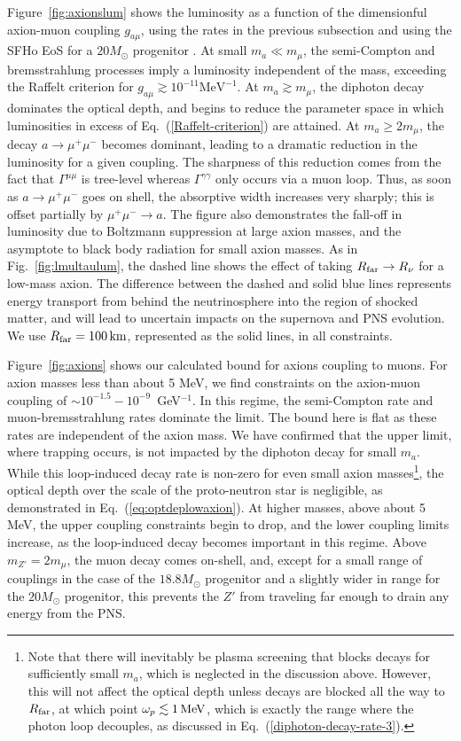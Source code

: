 \documentclass[11pt]{article}
\newcommand{\Eq}[1]{Eq.~(\ref{#1})} \newcommand{\Eqs}[2]{Eqs.~(\ref{#1}) and (\ref{#2})} \newcommand{\Eqm}[2]{Eqs.~(\ref{#1}) through (\ref{#2})}
\newcommand{\Fig}[1]{Fig.~\ref{#1}} \newcommand{\Figs}[2]{Figs.~\ref{#1} and \ref{#2}}
\begin{document}
Figure~\ref{fig:axionslum} shows the luminosity as a function of the dimensionful axion-muon coupling $g_{a \mu}$, using the rates in the previous subsection and using the SFHo EoS for a $20 M_\odot$ progenitor \cite{Bollig:2020xdr}. At small $m_a \ll m_\mu$, the semi-Compton and bremsstrahlung processes imply a luminosity independent of the mass, exceeding the Raffelt criterion for $g_{a\mu}\gtrsim  10^{-11} \text{MeV}^{-1}$. At $m_a \gtrsim m_\mu$, the diphoton decay dominates the optical depth, and begins to reduce the parameter space in which luminosities in excess of Eq.~(\ref{Raffelt-criterion}) are attained. At $m_a \geq 2m_\mu$, the decay $a \to \mu^+ \mu^-$ becomes dominant, leading to a dramatic reduction in the luminosity for a given coupling. The sharpness of this reduction comes from the fact that $\Gamma^{\mu \mu}$ is tree-level whereas $\Gamma^{\gamma \gamma}$ only occurs via a muon loop. Thus, as soon as $a \to \mu^+ \mu^-$ goes on shell, the absorptive width increases very sharply; this is offset partially by $\mu^+ \mu^- \to a$. The figure also demonstrates the fall-off in luminosity due to Boltzmann suppression at large axion masses, and the asymptote to black body radiation for small axion masses. As in \Fig{fig:lmultaulum}, the dashed line shows the effect of taking $R_{\rm far} \to R_\nu$ for a low-mass axion. The difference between the dashed and solid blue lines represents energy transport from behind the neutrinosphere into the region of shocked matter, and will lead to uncertain impacts on the supernova and PNS evolution. We use $R_{\rm far}=100\operatorname{km}$, represented as the solid lines, in all constraints.

Figure~\ref{fig:axions} shows our calculated bound for axions coupling to muons. For axion masses less than about 5 MeV, we find constraints on the axion-muon coupling of $\sim10^{-1.5}  - 10^{-9}$~GeV$^{-1}$. In this regime, the semi-Compton rate and muon-bremsstrahlung rates dominate the limit. The bound here is flat as these rates are independent of the axion mass. We have confirmed that the upper limit, where trapping occurs, is not impacted by the diphoton decay for small $m_a$. While this loop-induced decay rate is non-zero for even small axion masses\footnote{Note that there will inevitably be plasma screening that blocks decays for sufficiently small $m_a$, which is neglected in the discussion above. However, this will not affect the optical depth unless decays are blocked all the way to $R_{\rm far}$, at which point $\omega_p \lesssim 1 \operatorname{MeV}$, which is exactly the range where the photon loop decouples, as discussed in \Eq{diphoton-decay-rate-3}.}, the optical depth over the scale of the proto-neutron star is negligible, as demonstrated in Eq.~(\ref{eq:optdeplowaxion}). At higher masses, above about 5 MeV, the upper coupling constraints begin to drop, and the lower coupling limits increase, as the loop-induced decay becomes important in this regime. Above $m_{Z'} = 2m_\mu$, the muon decay comes on-shell, and, except for a small range of couplings in the case of the $18.8 M_\odot$ progenitor and a slightly wider in range for the $20M_\odot$ progenitor, this prevents the $Z'$ from traveling far enough to drain any energy from the PNS.
\end{document}

